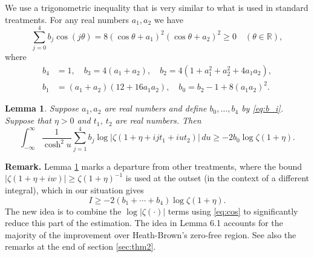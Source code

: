 \documentclass[10pt]{amsart}
\theoremstyle{remark}
\theoremstyle{plain}
\newtheorem{lemma}{Lemma}[section]
\numberwithin{equation}{section}
\theoremstyle{definition}
\def\({\left(}
\def\){\right)}
\begin{document}
We use a trigonometric inequality that is very similar
to what is used in standard treatments.  For any real numbers $a_1,a_2$ we 
have
\begin{equation}
\sum_{j=0}^4 b_j \cos(j\theta)=
8(\cos\theta+a_1)^2(\cos\theta+a_2)^2 \ge 0 \quad (\theta\in \mathbb{R}),
\label{eq:cos}
\end{equation}
where 
\begin{equation}
\begin{split}
b_4&=1, \quad b_3=4(a_1+a_2), \quad b_2=4(1+a_1^2+a_2^2+4a_1a_2), \\
b_1&=(a_1+a_2)(12+16a_1a_2), \quad b_0=b_2-1+8(a_1a_2)^2.
\end{split}\label{eq:b_i}
\end{equation}

\begin{lemma}\label{lem:int sum}
Suppose $a_1, a_2$ are real numbers and define $b_0,\ldots,b_4$ by
\eqref{eq:b_i}. 
Suppose that $\eta>0$ and $t_1$, $t_2$ are real numbers.  Then
$$
\int_{-\infty}^\infty \frac{1}{\cosh^2 u} \sum_{j=1}^4 b_j 
\log \left| \zeta\(1+\eta+ijt_1+iut_2 \) \right|\, du
\ge -2b_0 \log \zeta(1+\eta).
$$
\end{lemma}

{\bf Remark.}
Lemma \ref{lem:int sum}
 marks a departure from other treatments, where the bound
$|\zeta(1+\eta+iw)|\ge \zeta(1+\eta)^{-1}$ is used at the outset (in the
context of a different integral),  which in our
situation gives 
$$
I \ge - 2(b_1+\cdots+b_4)\log \zeta(1+\eta).
$$
The new idea is to combine the $\log |\zeta(\cdot)|$ terms
using \eqref{eq:cos} to significantly reduce this part of the estimation.
The idea in Lemma 6.1 accounts for the majority of the improvement 
over Heath-Brown's zero-free region.  See also the remarks at the end
of section \ref{sec:thm2}.
\medskip
\end{document}
